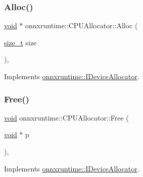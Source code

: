 \subsubsection{\texorpdfstring{Alloc()}{Alloc()}}
{\footnotesize\ttfamily \mbox{\hyperlink{mlasi_8h_a88f941d423cb2a819b70a1358982b1a6}{void}} $\ast$ onnxruntime\+::\+C\+P\+U\+Allocator\+::\+Alloc (\begin{DoxyParamCaption}\item[{\mbox{\hyperlink{mlasi_8h_a503efbc1c6e50825320ad909366b78ab}{size\+\_\+t}}}]{size }\end{DoxyParamCaption})\hspace{0.3cm}{\ttfamily [override]}, {\ttfamily [virtual]}}



Implements \mbox{\hyperlink{classonnxruntime_1_1IDeviceAllocator_aa703af32705cabad8c9f69e60efcfb6b}{onnxruntime\+::\+I\+Device\+Allocator}}.

\mbox{\label{classonnxruntime_1_1CPUAllocator_affe0e58d7fc048fb2cef9fc6704fdd91}} 
\subsubsection{\texorpdfstring{Free()}{Free()}}
{\footnotesize\ttfamily \mbox{\hyperlink{mlasi_8h_a88f941d423cb2a819b70a1358982b1a6}{void}} onnxruntime\+::\+C\+P\+U\+Allocator\+::\+Free (\begin{DoxyParamCaption}\item[{\mbox{\hyperlink{mlasi_8h_a88f941d423cb2a819b70a1358982b1a6}{void}} $\ast$}]{p }\end{DoxyParamCaption})\hspace{0.3cm}{\ttfamily [override]}, {\ttfamily [virtual]}}



Implements \mbox{\hyperlink{classonnxruntime_1_1IDeviceAllocator_aeabef1862123ae6d9478199db974e32a}{onnxruntime\+::\+I\+Device\+Allocator}}.

\mbox{\label{classonnxruntime_1_1CPUAllocator_a5eda291e0b728ea21d1f6893b5108020}} 
